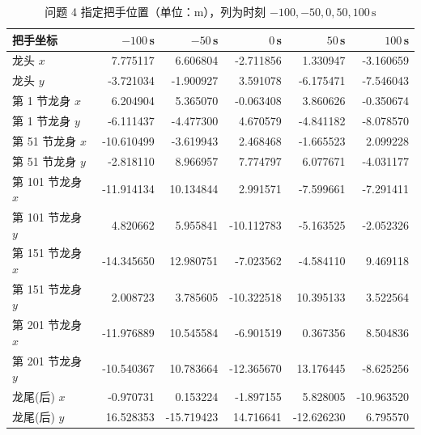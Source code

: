 \documentclass[a4paper, 12pt]{ctexart}
\begin{document}
\begin{table}[H]
  \centering
  \footnotesize
  \setlength{\tabcolsep}{5.5pt}
  \caption{问题 4 指定把手位置（单位：m），列为时刻 $-100,-50,0,50,100\,\mathrm{s}$}
  \label{tab:p4_pos}
  \begin{tabular}{lrrrrr}
    \toprule
    \textbf{把手坐标} & \textbf{$-100\,$s} & \textbf{$-50\,$s} & \textbf{$0\,$s} & \textbf{$50\,$s} & \textbf{$100\,$s} \\
    \midrule
    龙头 $x$ & 7.775117 & 6.606804 & -2.711856 & 1.330947 & -3.160659 \\
    龙头 $y$ & -3.721034 & -1.900927 & 3.591078 & -6.175471 & -7.546043 \\
    第 1 节龙身 $x$ & 6.204904 & 5.365070 & -0.063408 & 3.860626 & -0.350674 \\
    第 1 节龙身 $y$ & -6.111437 & -4.477300 & 4.670579 & -4.841182 & -8.078570 \\
    第 51 节龙身 $x$ & -10.610499 & -3.619943 & 2.468468 & -1.665523 & 2.099228 \\
    第 51 节龙身 $y$ & -2.818110 & 8.966957 & 7.774797 & 6.077671 & -4.031177 \\
    第 101 节龙身 $x$ & -11.914134 & 10.134844 & 2.991571 & -7.599661 & -7.291411 \\
    第 101 节龙身 $y$ & 4.820662 & 5.955841 & -10.112783 & -5.163525 & -2.052326 \\
    第 151 节龙身 $x$ & -14.345650 & 12.980751 & -7.023562 & -4.584110 & 9.469118 \\
    第 151 节龙身 $y$ & 2.008723 & 3.785605 & -10.322518 & 10.395133 & 3.522564 \\
    第 201 节龙身 $x$ & -11.976889 & 10.545584 & -6.901519 & 0.367356 & 8.504836 \\
    第 201 节龙身 $y$ & -10.540367 & 10.783664 & -12.365670 & 13.176445 & -8.625256 \\
    龙尾(后) $x$ & -0.970731 & 0.153224 & -1.897155 & 5.828005 & -10.963520 \\
    龙尾(后) $y$ & 16.528353 & -15.719423 & 14.716641 & -12.626230 & 6.795570 \\
    \bottomrule
  \end{tabular}
\end{table}
\end{document}
